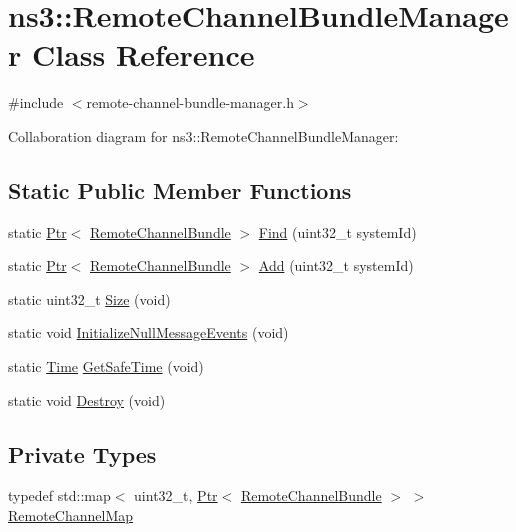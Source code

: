 \hypertarget{classns3_1_1RemoteChannelBundleManager}{}\section{ns3\+:\+:Remote\+Channel\+Bundle\+Manager Class Reference}
\label{classns3_1_1RemoteChannelBundleManager}


{\ttfamily \#include $<$remote-\/channel-\/bundle-\/manager.\+h$>$}



Collaboration diagram for ns3\+:\+:Remote\+Channel\+Bundle\+Manager\+:
\subsection*{Static Public Member Functions}
\begin{DoxyCompactItemize}
\item 
static \hyperlink{classns3_1_1Ptr}{Ptr}$<$ \hyperlink{classns3_1_1RemoteChannelBundle}{Remote\+Channel\+Bundle} $>$ \hyperlink{classns3_1_1RemoteChannelBundleManager_a143cfdce189ed68cc0917255ef0b849f}{Find} (uint32\+\_\+t system\+Id)
\item 
static \hyperlink{classns3_1_1Ptr}{Ptr}$<$ \hyperlink{classns3_1_1RemoteChannelBundle}{Remote\+Channel\+Bundle} $>$ \hyperlink{classns3_1_1RemoteChannelBundleManager_a5cd184a98e821db4998273bd88ba9c4a}{Add} (uint32\+\_\+t system\+Id)
\item 
static uint32\+\_\+t \hyperlink{classns3_1_1RemoteChannelBundleManager_aaf679dae2468048f39ee77ec6b41db64}{Size} (void)
\item 
static void \hyperlink{classns3_1_1RemoteChannelBundleManager_a5a1591054edf61b8d81c85a425a5dae8}{Initialize\+Null\+Message\+Events} (void)
\item 
static \hyperlink{classns3_1_1Time}{Time} \hyperlink{classns3_1_1RemoteChannelBundleManager_a74c1e195eccd8cb60c6597f1e5ed6450}{Get\+Safe\+Time} (void)
\item 
static void \hyperlink{classns3_1_1RemoteChannelBundleManager_ab6be525e9be8b1406d95ed9f88d06b1f}{Destroy} (void)
\end{DoxyCompactItemize}
\subsection*{Private Types}
\begin{DoxyCompactItemize}
\item 
typedef std\+::map$<$ uint32\+\_\+t, \hyperlink{classns3_1_1Ptr}{Ptr}$<$ \hyperlink{classns3_1_1RemoteChannelBundle}{Remote\+Channel\+Bundle} $>$ $>$ \hyperlink{classns3_1_1RemoteChannelBundleManager_adb9c9a37cc4b94dd3286ca121a39bda1}{Remote\+Channel\+Map}
\end{DoxyCompactItemize}
